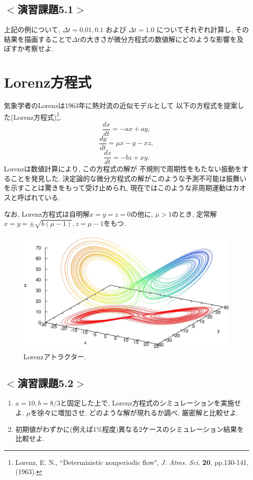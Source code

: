 

\subsection*{$<$演習課題5.1$>$}
上記の例について, $\Delta t=0.01, 0.1$ および $\Delta t=1.0$ についてそれぞれ計算し, 
その結果を描画することで$\Delta t$の大きさが微分方程式の数値解にどのような影響を及ぼすか考察せよ. 

\section{Lorenz方程式}
気象学者のLorenzは1963年に熱対流の近似モデルとして
以下の方程式を提案した(Lorenz方程式)\footnote{
Lorenz, E. N., ``Deterministic nonperiodic flow", \textit{J. Atms. Sci.} \textbf{20}, pp.130-141, (1963). 
}.
\begin{equation}
\dfrac{dx}{dt}=-ax+ay,
\end{equation}
\begin{equation}
\dfrac{dy}{dt}=\mu x-y-xz,
\end{equation}
\begin{equation}
\dfrac{dz}{dt}=-bz+xy.
\end{equation}
Lorenzは数値計算により, この方程式の解が
不規則で周期性をもたない振動をすることを発見した.
決定論的な微分方程式の解がこのような予測不可能は振舞いを示すことは驚きをもって受け止められ, 
現在ではこのような非周期運動はカオスと呼ばれている.

なお, Lorenz方程式は自明解$x=y=z=0$の他に,
$\mu >1$のとき, 定常解$x=y=\pm \sqrt{b(\mu-1)}, z=\mu-1$をもつ.

\begin{figure}[ht]
\centering
\includegraphics[width=0.9\linewidth]{9_fortran6/figs/lorenz.eps}
\caption{Lorenzアトラクター. }
\end{figure}

\subsection*{$<$演習課題5.2$>$}
\begin{enumerate}
\item $a=10, b=8/3$と固定した上で, Lorenz方程式のシミュレーションを実施せよ.
$\mu$を徐々に増加させ, どのような解が現れるか調べ, 厳密解と比較せよ. 
\item 初期値がわずかに(例えば1\%程度)異なる2ケースのシミュレーション結果を比較せよ.
\end{enumerate}


